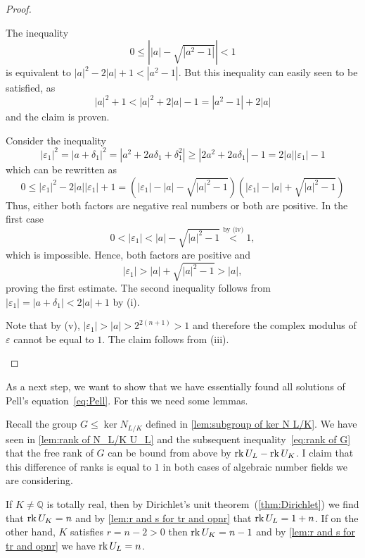 \begin{proof}
\begin{plist}
    \item The inequality
    \[
      0 ≤ \left\vert |a| - \sqrt{|a^2 - 1|} \right\vert < 1
    \]
    is equivalent to \(|a|^2 - 2 |a| + 1 < |a^2 - 1|\). But this inequality can
    easily seen to be satisfied, as
    \[
      |a|^2 + 1 < |a|^2 + 2|a| - 1 = |a^2 - 1| + 2 |a|
    \]
    and the claim is proven.

    \item Consider the inequality
    \[
      |ε_1|^2 = |a + δ_1|^2 = |a^2 + 2 a δ_1 + δ_1^2| ≥ |2a^2 + 2a δ_1| - 1 =
                2 |a| |ε_1| - 1
    \]
    which can be rewritten as
    \[
      0 ≤ |ε_1|^2 - 2 |a| |ε_1| + 1 =
          \left(|ε_1| - |a| - \sqrt{|a|^2 - 1}\right)
          \left(|ε_1| - |a| + \sqrt{|a|^2 - 1}\right)
    \]
    Thus, either both factors are negative real numbers or both are positive. In
    the first case
    \[
      0 < |ε_1| < |a| - \sqrt{|a|^2 - 1} \overset{\text{by (iv)}}{<} 1,
    \]
    which is impossible. Hence, both factors are positive and
    \[
      |ε_1| > |a| + \sqrt{|a|^2 - 1}  > |a|,
    \]
    proving the first estimate. The second inequality follows from \(|ε_1| = |a
    + δ_1| < 2|a| + 1\) by (i).

    \item Note that by (v), \(|ε_1| > |a| > 2^{2(n + 1)} > 1\) and therefore the
    complex modulus of \(ε\) cannot be equal to \(1\). The claim follows from
    (iii).
  \end{plist}
\end{proof}

As a next step, we want to show that we have essentially found all solutions of
Pell's equation~\eqref{eq:Pell}. For this we need some lemmas.

Recall the group \(G ≤ \ker N_{L / K}\) defined in \cref{lem:subgroup of ker N
L/K}. We have seen in \cref{lem:rank of N_L/K U_L} and the subsequent
inequality~\eqref{eq:rank of G} that the free rank of \(G\) can be bound from
above by \(\operatorname{rk} U_L - \operatorname{rk} U_K\). I claim that this difference of ranks is equal
to \(1\) in both cases of algebraic number fields we are considering.

If \(K ≠ ℚ\) is totally real, then by Dirichlet's unit
theorem~(\ref{thm:Dirichlet}) we find that \(\operatorname{rk} U_K = n\) and by \cref{lem:r
and s for tr and opnr} that \(\operatorname{rk} U_L = 1 + n\). If on the other hand, \(K\)
satisfies \(r = n - 2 > 0\) then \(\operatorname{rk} U_K = n - 1\) and by \cref{lem:r and s
for tr and opnr} we have \(\operatorname{rk} U_L = n\).


